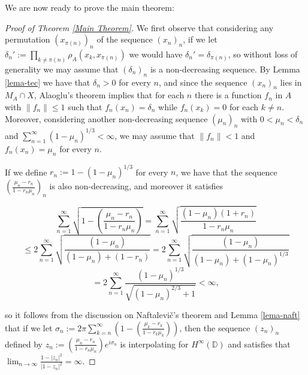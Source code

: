 \documentclass[preprint,12pt,number]{elsarticle}
\newtheorem{remark}[theorem]{Remark}
\newcommand{\D}{\mathbb{D}}
\begin{document}

We are now ready to prove the main theorem: %

\begin{proof}[Proof of Theorem \ref{Main Theorem}]
    We first observe that considering any permutation $(x_{\pi(n)})_n$ of the sequence $(x_n)_n$, if we let $\delta_n':=\prod_{k\neq \pi(n)}\rho_A(x_k,x_{\pi(n)})$ we would have $\delta_n'=\delta_{\pi(n)}$, so without loss of generality  we may assume that $(\delta_n)_n$ is a non-decreasing sequence. By Lemma \ref{lema-tec} we have that $\delta_n>0$ for every $n$, and since the sequence $(x_n)_n$ lies in $M_A\cap X$, Alaoglu's theorem implies that for each $n$ there is a function $f_n$ in $A$ with $\lVert f_n \rVert\leq1$ such that $f_n(x_n)=\delta_n$ while $f_n(x_k)=0$ for each $k\neq n$. Moreover, considering another non-decreasing sequence $(\mu_n)_n$ with $0<\mu_n<\delta_n$ and $\sum_{n=1}^\infty(1-\mu_n)^{1/3}<\infty$, we may assume that $\lVert f_n \rVert<1$ and  $f_n(x_n)=\mu_n$ for every $n$. 
    
    If we define $r_n:=1-(1-\mu_n)^{1/3}$ for every $n$, we have that the sequence $\left(\frac{\mu_n-r_n}{1-r_n\mu_n}\right)_n$ is also non-decreasing, and moreover it satisfies 
   
    
    $$\sum_{n=1}^\infty\sqrt{1-\left(\frac{\mu_n-r_n}{1-r_n\mu_n}\right)} = \sum_{n=1}^\infty\sqrt{\frac{(1-\mu_n)(1+r_n)}{1-r_n\mu_n}} $$$$ \leq 2 \sum_{n=1}^\infty\sqrt{\frac{(1-\mu_n)}{(1-\mu_n)+(1-r_n)}} 
    = 2 \sum_{n=1}^\infty\sqrt{\frac{(1-\mu_n)}{(1-\mu_n)+(1-\mu_n)^{1/3}}} $$ $$ = 2 \sum_{n=1}^\infty\frac{(1-\mu_n)^{1/3}}{\sqrt{(1-\mu_n)^{2/3}+1}}<\infty,$$
   
    
    so it follows from the discussion on Naftalevi\v{c}'s theorem and Lemma \ref{lema-naft} that if we let $\sigma_n:=2\pi\sum_{k=n}^\infty \left(1-\left(\frac{\mu_k-r_k}{1-r_k\mu_k}\right)\right)$, then the sequence $(z_n)_n$ defined by $z_n:=\left(\frac{\mu_n-r_n}{1-r_n\mu_n}\right)e^{i\sigma_n}$ is interpolating for $H^\infty(\D)$ and satisfies that $\lim_{n\rightarrow\infty}\frac{1-|z_n|^2}{|1-z_n|^2}=\infty$. 


\end{proof}
\end{document}
